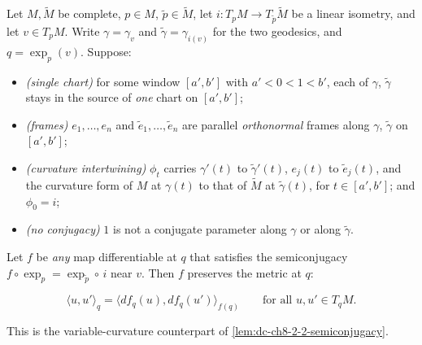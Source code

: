\begin{lemma}
  \label{lem:dc-ch8-2-1-exp-norm-transfer-general}


  Let $M,\tilde M$ be complete, $p\in M$, $\tilde p\in\tilde M$, let $i:T_pM\to
  T_{\tilde p}\tilde M$ be a linear isometry, and let $v\in T_pM$. Write $\gamma=\gamma_v$
  and $\tilde\gamma=\gamma_{i(v)}$ for the two geodesics, and $q=\exp_p(v)$. Suppose:
  \begin{itemize}
    \item \emph{(single chart)} for some window $[a',b']$ with $a'<0<1<b'$, each of $\gamma$,
      $\tilde\gamma$ stays in the source of \emph{one} chart on $[a',b']$;
    \item \emph{(frames)} $e_1,\dots,e_n$ and $\tilde e_1,\dots,\tilde e_n$ are parallel
      \emph{orthonormal} frames along $\gamma$, $\tilde\gamma$ on $[a',b']$;
    \item \emph{(curvature intertwining)} $\phi_t$ carries $\gamma'(t)$ to
      $\tilde\gamma'(t)$, $e_j(t)$ to $\tilde e_j(t)$, and the curvature form of $M$ at
      $\gamma(t)$ to that of $\tilde M$ at $\tilde\gamma(t)$, for $t\in[a',b']$; and
      $\phi_0=i$;
    \item \emph{(no conjugacy)} $1$ is not a conjugate parameter along $\gamma$ or along
      $\tilde\gamma$.
  \end{itemize}
  Let $f$ be \emph{any} map differentiable at $q$ that satisfies the semiconjugacy
  $f\circ\exp_p=\exp_{\tilde p}\circ\,i$ near $v$. Then $f$ preserves the metric at $q$:

  $$
  \langle u,u'\rangle_q=\langle df_q(u),df_q(u')\rangle_{f(q)}\qquad\text{for all }u,u'\in T_qM .
  $$

  This is the variable-curvature counterpart of \cref{lem:dc-ch8-2-2-semiconjugacy}.
\end{lemma}
